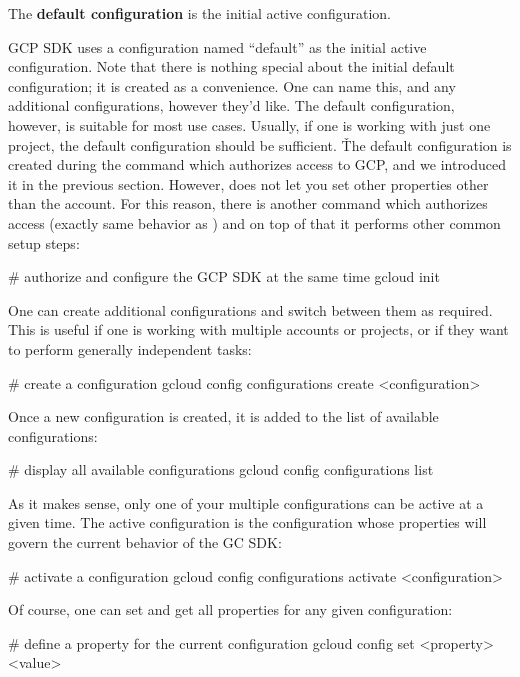 The \textbf{default configuration} is the initial active configuration.
\ed

GCP SDK uses a configuration named ``default'' as the initial active configuration. Note that there is nothing special
about the initial default configuration; it is created as a convenience. One can name this, and any additional
configurations, however they'd like. The default configuration, however, is suitable for most use cases. Usually, if
one is working with just one project, the default configuration should be sufficient. \v

The default configuration is created during the  command which authorizes access to GCP\@,
and we introduced it in the previous section. However,  does not let you set other
properties other than the account. For this reason, there is another command  which authorizes
access (exactly same behavior as ) and on top of that it performs other common setup steps:
\begin{bash}
# authorize and configure the GCP SDK at the same time
gcloud init
\end{bash}

One can create additional configurations and switch between them as required. This is useful if one is working with
multiple accounts or projects, or if they want to perform generally independent tasks:
\begin{bash}
# create a configuration
gcloud config configurations create <configuration>
\end{bash}

Once a new configuration is created, it is added to the list of available configurations:
\begin{bash}
# display all available configurations
gcloud config configurations list
\end{bash}

As it makes sense, only one of your multiple configurations can be active at a given time. The active configuration
is the configuration whose properties will govern the current behavior of the GC SDK\@:
\begin{bash}
# activate a configuration
gcloud config configurations activate <configuration>
\end{bash}

Of course, one can set and get all properties for any given configuration:
\begin{bash}
# define a property for the current configuration
gcloud config set <property> <value>
\end{bash}

